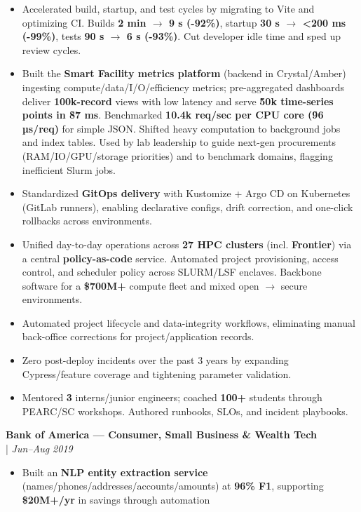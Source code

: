 \documentclass[11pt,a4paper]{article}
\newcommand{\regbullet}[1]{
    \item {\fontsize{10}{12}\selectfont #1}
}
\begin{document}
\begin{itemize}[leftmargin=18pt,itemsep=1pt,topsep=0pt]
\regbullet{Accelerated build, startup, and test cycles by migrating to Vite and optimizing CI. Builds \textbf{2 min $\rightarrow$ 9 s (-92\%)}, startup \textbf{30 s $\rightarrow$ <200 ms (-99\%)}, tests \textbf{90 s $\rightarrow$ 6 s (-93\%)}. Cut developer idle time and sped up review cycles.}

\regbullet{Built the \textbf{Smart Facility metrics platform} (backend in Crystal/Amber) ingesting compute/data/I/O/efficiency metrics; pre-aggregated dashboards deliver \textbf{100k-record} views with low latency and serve \textbf{\~50k time-series points in \~87 ms}. Benchmarked \~\textbf{10.4k req/sec per CPU core (\~96 µs/req)} for simple JSON. Shifted heavy computation to background jobs and index tables. Used by lab leadership to guide next-gen procurements (RAM/IO/GPU/storage priorities) and to benchmark domains, flagging inefficient Slurm jobs.}

\regbullet{Standardized \textbf{GitOps delivery} with Kustomize + Argo CD on Kubernetes (GitLab runners), enabling declarative configs, drift correction, and one-click rollbacks across environments.}

\regbullet{Unified day-to-day operations across \textbf{27 HPC clusters} (incl. \textbf{Frontier}) via a central \textbf{policy-as-code} service. Automated project provisioning, access control, and scheduler policy across SLURM/LSF enclaves. Backbone software for a \textbf{\$700M+} compute fleet and mixed open $\rightarrow$ secure environments.}

\regbullet{Automated project lifecycle and data-integrity workflows, eliminating manual back-office corrections for project/application records.}

\regbullet{Zero post-deploy incidents over the past 3 years by expanding Cypress/feature coverage and tightening parameter validation.}

\regbullet{Mentored \textbf{3} interns/junior engineers; coached \textbf{100+} students through PEARC/SC workshops. Authored runbooks, SLOs, and incident playbooks.}
\end{itemize}

\vspace{8pt}
\noindent\textbf{Bank of America — Consumer, Small Business \& Wealth Tech}\\
  |  {\fontsize{10}{12}\selectfont\textit{Jun--Aug 2019}}
\begin{itemize}[leftmargin=18pt,itemsep=1pt,topsep=0pt]
\regbullet{Built an \textbf{NLP entity extraction service} (names/phones/addresses/accounts/amounts) at \textbf{96\% F1}, supporting \textbf{\$20M+/yr} in savings through automation}
\end{itemize}
\end{document}
